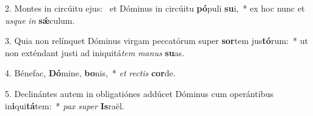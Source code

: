 2. Montes in circúitu ejus: \dag\  et Dóminus in circúitu \textbf{pó}puli \textbf{su}i,~*  ex hoc nunc et \textit{us}\textit{que} \textit{in} \textbf{sǽ}culum.\

3. Quia non relínquet Dóminus virgam peccatórum super \textbf{sor}tem jus\textbf{tó}rum:~*  ut non exténdant justi ad iniquitá\textit{tem} \textit{ma}\textit{nus} \textbf{su}as.\

4. Bénefac, \textbf{Dó}mine, \textbf{bo}nis,~*  \textit{et} \textit{rec}\textit{tis} \textbf{cor}de.\

5. Declinántes autem in obligatiónes addúcet Dóminus cum operántibus in\textbf{i}qui\textbf{tá}tem:~*  \textit{pax} \textit{su}\textit{per} \textbf{Is}raël.\

